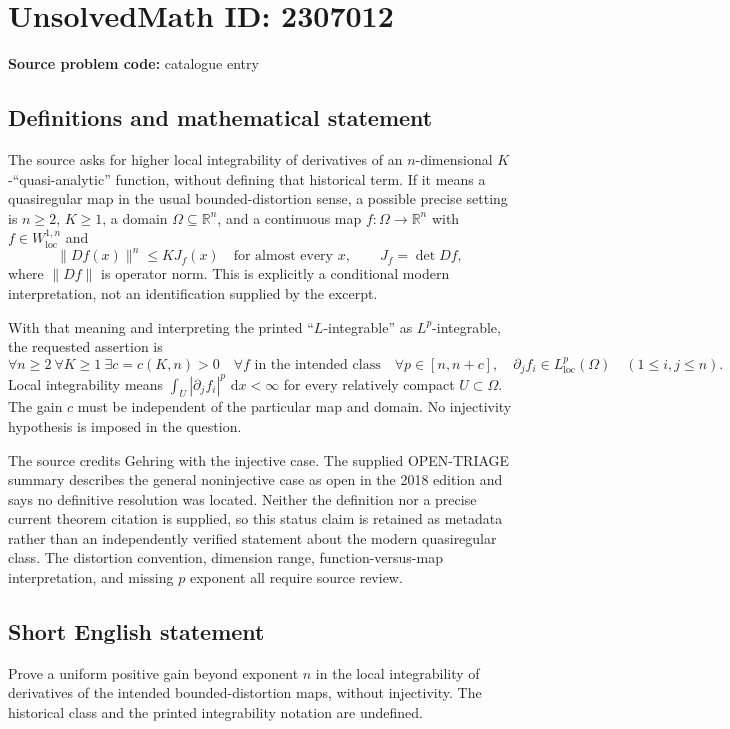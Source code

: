 \documentclass[11pt]{article}
\newcommand{\R}{\mathbb{R}}
\newcommand{\dd}{\,\mathrm{d}}
\begin{document}
\section*{UnsolvedMath ID: 2307012}
\textbf{Source problem code:} catalogue entry
\subsection{Definitions and mathematical statement}
The source asks for higher local integrability of derivatives of an \(n\)-dimensional \(K\)-``quasi-analytic'' function, without defining that historical term. If it means a quasiregular map in the usual bounded-distortion sense, a possible precise setting is \(n\ge2\), \(K\ge1\), a domain \(\Omega\subseteq\R^n\), and a continuous map \(f:\Omega\to\R^n\) with \(f\in W^{1,n}_{\mathrm{loc}}\) and
\[
\|Df(x)\|^n\le KJ_f(x)\quad\text{for almost every }x,\qquad
J_f=\det Df,
\]
where \(\|Df\|\) is operator norm. This is explicitly a conditional modern interpretation, not an identification supplied by the excerpt.

With that meaning and interpreting the printed ``\(L\)-integrable'' as \(L^p\)-integrable, the requested assertion is
\[
\forall n\ge2\ \forall K\ge1\ \exists c=c(K,n)>0\quad
\forall f\text{ in the intended class}\quad
\forall p\in[n,n+c],\quad
\partial_j f_i\in L^p_{\mathrm{loc}}(\Omega)\quad(1\le i,j\le n).
\]
Local integrability means \(\int_U|\partial_j f_i|^p\,\dd x<\infty\) for every relatively compact \(U\subset\Omega\). The gain \(c\) must be independent of the particular map and domain. No injectivity hypothesis is imposed in the question.

The source credits Gehring with the injective case. The supplied OPEN-TRIAGE summary describes the general noninjective case as open in the 2018 edition and says no definitive resolution was located. Neither the definition nor a precise current theorem citation is supplied, so this status claim is retained as metadata rather than an independently verified statement about the modern quasiregular class. The distortion convention, dimension range, function-versus-map interpretation, and missing \(p\) exponent all require source review.
\subsection{Short English statement}
Prove a uniform positive gain beyond exponent \(n\) in the local integrability of derivatives of the intended bounded-distortion maps, without injectivity. The historical class and the printed integrability notation are undefined.
\end{document}
